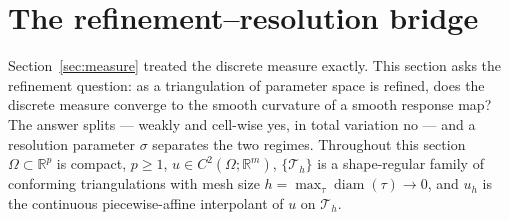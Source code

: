 \documentclass[11pt,a4paper]{article}
\theoremstyle{plain}
\theoremstyle{definition}
\theoremstyle{remark}
\newcommand{\RR}{\mathbb{R}}
\begin{document}
\section{The refinement--resolution bridge}
\label{sec:theoremB}

Section~\ref{sec:measure} treated the discrete measure exactly. This
section asks the refinement question: as a triangulation of parameter
space is refined, does the discrete measure converge to the smooth
curvature of a smooth response map? The answer splits --- weakly and
cell-wise yes, in total variation no --- and a resolution parameter
$\sigma$ separates the two regimes. Throughout this section $\Omega \subset \RR^p$ is compact, $p \ge 1$,
$u \in C^2(\Omega; \RR^m)$, $\{\mathcal{T}_h\}$ is a shape-regular family
of conforming triangulations with mesh size
$h = \max_\tau \operatorname{diam}(\tau) \to 0$, and $u_h$ is the
continuous piecewise-affine interpolant of $u$ on $\mathcal{T}_h$.
\end{document}
